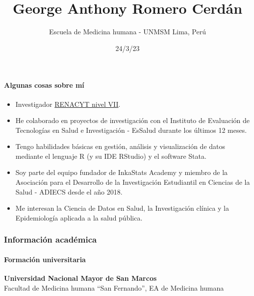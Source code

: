 \documentclass[
  letterpaper,
  DIV=11,
  numbers=noendperiod]{scrartcl}
\title{George Anthony Romero Cerdán}
\subtitle{Escuela de Medicina humana - UNMSM \textbar{} Lima, Perú}
\author{}
\date{24/3/23}
\let\oldparagraph\paragraph
\renewcommand{\paragraph}[1]{\oldparagraph{#1}\mbox{}}
\providecommand{\tightlist}{%
  \setlength{\itemsep}{0pt}\setlength{\parskip}{0pt}}\usepackage{longtable,booktabs,array}
\begin{document}
\maketitle
\ifdefined\Shaded\renewenvironment{Shaded}{\begin{tcolorbox}[interior hidden, sharp corners, boxrule=0pt, enhanced, frame hidden, breakable, borderline west={3pt}{0pt}{shadecolor}]}{\end{tcolorbox}}\fi

\hypertarget{algunas-cosas-sobre-muxed}{%
\paragraph{Algunas cosas sobre mí}\label{algunas-cosas-sobre-muxed}}

\begin{itemize}
\tightlist
\item
  Investigador
  \href{https://ctivitae.concytec.gob.pe/appDirectorioCTI/VerDatosInvestigador.do?id_investigador=0138155}{RENACYT
  nivel VII}.
\item
  He colaborado en proyectos de investigación con el Instituto de
  Evaluación de Tecnologías en Salud e Investigación - EsSalud durante
  los últimos 12 meses.
\item
  Tengo habilidades básicas en gestión, análisis y visualización de
  datos mediante el lenguaje R (y su IDE RStudio) y el software Stata.
\item
  Soy parte del equipo fundador de InkaStats Academy y miembro de la
  Asociación para el Desarrollo de la Investigación Estudiantil en
  Ciencias de la Salud - ADIECS desde el año 2018.
\item
  Me interesan la Ciencia de Datos en Salud, la Investigación clínica y
  la Epidemiología aplicada a la salud pública.
\end{itemize}

\hypertarget{informaciuxf3n-acaduxe9mica}{%
\subsubsection{Información
académica}\label{informaciuxf3n-acaduxe9mica}}

\hypertarget{formaciuxf3n-universitaria}{%
\paragraph{Formación universitaria}\label{formaciuxf3n-universitaria}}

\textbf{Universidad Nacional Mayor de San Marcos}\\
Facultad de Medicina humana ``San Fernando'', EA de Medicina humana
\end{document}
